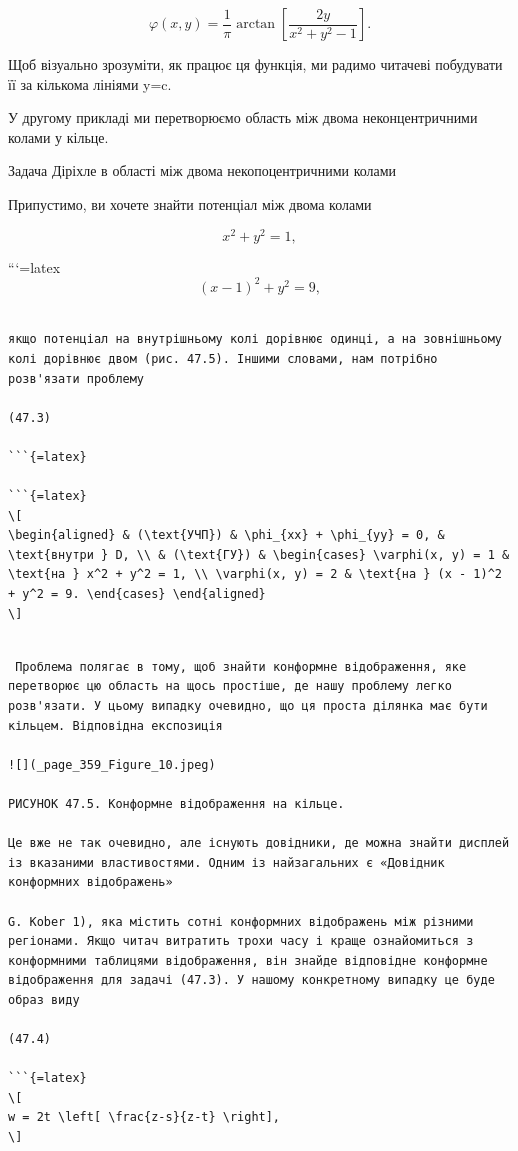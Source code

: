 \documentclass[
]{article}
\begin{document}
\[
\varphi(x, y) = \frac{1}{\pi} \arctan\left[\frac{2y}{x^2 + y^2 - 1}\right].
\]

Щоб візуально зрозуміти, як працює ця функція, ми радимо читачеві
побудувати її за кількома лініями y=c.

У другому прикладі ми перетворюємо область між двома неконцентричними
колами у кільце.

Задача Діріхле в області між двома некопоцентричними колами

Припустимо, ви хочете знайти потенціал між двома колами

\[
x^{2} + y^{2} = 1,
\]

```{=latex}
\[
(x-1)^{2} + y^{2} = 9,
\]

\begin{verbatim}

якщо потенціал на внутрішньому колі дорівнює одинці, а на зовнішньому колі дорівнює двом (рис. 47.5). Іншими словами, нам потрібно розв'язати проблему

(47.3)

```{=latex}

```{=latex}
\[
\begin{aligned} & (\text{УЧП}) & \phi_{xx} + \phi_{yy} = 0, & \text{внутри } D, \\ & (\text{ГУ}) & \begin{cases} \varphi(x, y) = 1 & \text{на } x^2 + y^2 = 1, \\ \varphi(x, y) = 2 & \text{на } (x - 1)^2 + y^2 = 9. \end{cases} \end{aligned}
\]
\end{verbatim}

\begin{verbatim}

 Проблема полягає в тому, щоб знайти конформне відображення, яке перетворює цю область на щось простіше, де нашу проблему легко розв'язати. У цьому випадку очевидно, що ця проста ділянка має бути кільцем. Відповідна експозиція

![](_page_359_Figure_10.jpeg)

РИСУНОК 47.5. Конформне відображення на кільце.

Це вже не так очевидно, але існують довідники, де можна знайти дисплей із вказаними властивостями. Одним із найзагальних є «Довідник конформних відображень»

G. Kober 1), яка містить сотні конформних відображень між різними регіонами. Якщо читач витратить трохи часу і краще ознайомиться з конформними таблицями відображення, він знайде відповідне конформне відображення для задачі (47.3). У нашому конкретному випадку це буде образ виду

(47.4)

```{=latex}
\[
w = 2t \left[ \frac{z-s}{z-t} \right],
\]
\end{verbatim}
\end{document}
